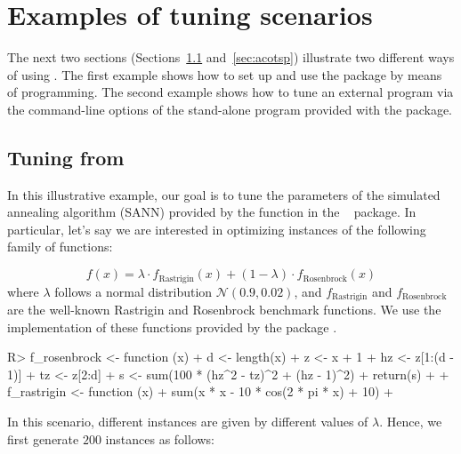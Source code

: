 \documentclass[article,a4paper,nojss,notitle]{jss}
\newcommand{\irace}{\pkg{irace}\xspace}
\newcommand{\aR}{\proglang{R}\xspace}
\newcommand{\parameter}[1]{\code{#1}}
\begin{document}

\section{Examples of tuning scenarios}\label{sec:applications}

The next two sections (Sections~\ref{sec:optim} and~\ref{sec:acotsp}) illustrate two different ways of using
\irace. The first example shows how to set up and use the \irace
package by means of \aR programming. The second example shows how to
tune an external program via the command-line options of the \irace
stand-alone program provided with the package.

\subsection[Tuning optim() from R]{Tuning  from \aR}\label{sec:optim}

In this illustrative example, our goal is to tune the parameters of
the simulated annealing algorithm (SANN) provided by the 
function in the \aR\  package. In particular, let's say we
are interested in optimizing instances of the following family of
functions:

\begin{equation}
  \label{eq:1}
  f(x) = \lambda \cdot f_\text{Rastrigin} (x) + (1 - \lambda) \cdot f_\text{Rosenbrock}(x)
\end{equation}
%
where $\lambda$ follows a normal distribution $\mathcal{N}(0.9,
0.02)$, and $f_\text{Rastrigin}$ and $f_\text{Rosenbrock}$ are the
well-known Rastrigin and Rosenbrock benchmark functions. We use the implementation of these functions provided by the package  \citep{R:cmaes}. 

\begin{CodeInput}
R> f_rosenbrock <- function (x) {
+    d <- length(x)
+    z <- x + 1
+    hz <- z[1:(d - 1)]
+    tz <- z[2:d]
+    s <- sum(100 * (hz^2 - tz)^2 + (hz - 1)^2)
+    return(s)
+  }
+  f_rastrigin <- function (x) {
+    sum(x * x - 10 * cos(2 * pi * x) + 10)
+  }
\end{CodeInput}

In this scenario, different instances are given by different values of
$\lambda$. Hence, we first generate $200$ instances as follows:
\end{document}
